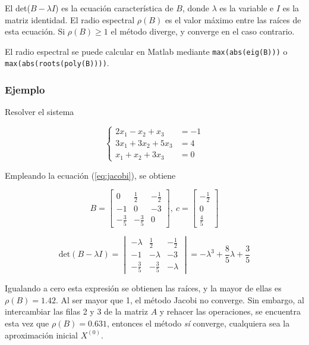 \documentclass{article}
\begin{document}
El det($B-\lambda I$) es la ecuación característica de $B$, donde $\lambda$ es 
la variable e $I$ es la matriz identidad. El radio espectral $\rho(B)$ es el 
valor máximo entre las raíces de esta ecuación. Si $\rho(B)\geq1$ el método 
diverge, y converge en el caso contrario.

El radio espectral se puede calcular en Matlab mediante \verb|max(abs(eig(B)))| 
o \verb|max(abs(roots(poly(B))))|.

\subsubsection{Ejemplo}

Resolver el sistema

\begin{equation*}
    \begin{cases}
        2x_1 - x_2 + x_3 &= -1  \\
        3x_1 + 3x_2 + 5x_3 &= 4 \\
        x_1 + x_2 + 3x_3 &= 0
    \end{cases}
\end{equation*}

Empleando la ecuación (\ref{eq:jacobi}), se obtiene

\begin{equation*}
    B =
    \begin{bmatrix}
        0 & \frac{1}{2} & -\frac{1}{2} \\
        -1 & 0 & -3 \\
        -\frac{3}{5} & -\frac{3}{5} & 0
    \end{bmatrix},\ 
    c =
    \begin{bmatrix}
        -\frac{1}{2} \\ 0 \\ \frac{4}{5}
    \end{bmatrix}
\end{equation*}

\begin{equation*}
    \text{det}(B-\lambda I) =
    \begin{vmatrix}
        -\lambda & \frac{1}{2} & -\frac{1}{2} \\
        -1 & -\lambda & -3 \\
        -\frac{3}{5} & -\frac{3}{5} & -\lambda
    \end{vmatrix}
    = -\lambda^3 + \frac{8}{5}\lambda + \frac{3}{5}
\end{equation*}

Igualando a cero esta expresión se obtienen las raíces, y la mayor de ellas es 
$\rho(B) = 1.42$. Al ser mayor que 1, el método Jacobi no converge. Sin embargo,
al intercambiar las filas 2 y 3 de la matriz $A$ y rehacer las operaciones, se 
encuentra esta vez que $\rho(B) = 0.631$, entonces el método \textit{sí} 
converge, cualquiera sea la aproximación inicial $X^{(0)}$.
\end{document}
